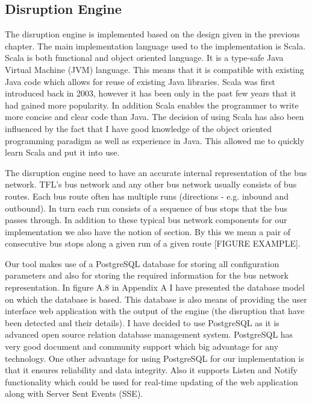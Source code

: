 \subsection{Disruption Engine}
The disruption engine is implemented based on the design given in the previous chapter. The main implementation language used to the implementation is Scala. Scala is both functional and object oriented language. It is a type-safe Java Virtual Machine (JVM) language. This means that it is compatible with existing Java code which allows for reuse of existing Java libraries. Scala was first introduced back in 2003, however it has been only in the past few years that it had gained more popularity. In addition Scala enables the programmer to write more concise and clear code than Java. The decision of using Scala has also been influenced by the fact that I have good knowledge of the object oriented programming paradigm as well as experience in Java. This allowed me to quickly learn Scala and put it into use.

The disruption engine need to have an accurate internal representation of the bus network. TFL's bus network and any other bus network usually consists of bus routes. Each bus route often has multiple runs (directions - e.g. inbound and outbound). In turn each run consists of a sequence of bus stops that the bus passes through. In addition to these typical bus network components for our implementation we also have the notion of section. By this we mean a pair of consecutive bus stops along a given run of a given route [FIGURE EXAMPLE].

Our tool makes use of a PostgreSQL database for storing all configuration parameters and also for storing the required information for the bus network representation. In figure A.8 in Appendix A I have presented the database model on which the database is based. This database is also means of providing the user interface web application with the output of the engine (the disruption that have been detected and their details). I have decided to use PostgreSQL as it is advanced open source relation database management system. PostgreSQL has very good document and community support which big advantage for any technology. One other advantage for using PostgreSQL for our implementation is that it ensures reliability and data integrity. Also it supports Listen and Notify functionality which could be used for real-time updating of the web application along with Server Sent Events (SSE).
	


